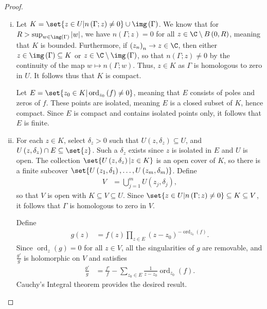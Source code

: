 \documentclass[10pt]{mypackage}
\begin{document}
\begin{proof}\hfill
  \begin{enumerate}[(i)]
    \item Let $K = \set{z\in U | n\left( \Gamma;z \right) \neq 0}\cup \img\left( \Gamma \right)$. We know that for $R > \sup_{w\in\img\left( \Gamma \right)}\left\vert w \right\vert$, we have $n\left( \Gamma;z \right) = 0$ for all $z\in \C\setminus B\left( 0,R \right)$, meaning that $K$ is bounded. Furthermore, if $\left( z_n \right)_n\rightarrow z\in \C$, then either $z\in \img\left( \Gamma \right)\subseteq K$ or $z\in \C\setminus \img\left( \Gamma \right)$, so that $n\left( \Gamma;z \right) \neq 0$ by the continuity of the map $w\mapsto n\left( \Gamma;w \right)$. Thus, $z\in K$ as $\Gamma$ is homologous to zero in $U$. It follows thus that $K$ is compact.%

      Let $E = \set{z_0\in K | \operatorname{ord}_{z_0}\left( f \right)\neq 0}$, meaning that $E$ consists of poles and zeros of $f$. These points are isolated, meaning $E$ is a closed subset of $K$, hence compact. Since $E$ is compact and contains isolated points only, it follows that $E$ is finite.
    \item For each $z\in K$, select $\delta_z > 0$ such that $U\left( z,\delta_z \right)\subseteq U$, and $U\left( z,\delta_z \right)\cap E \subseteq \set{z}$. Such a $\delta_z$ exists since $z$ is isolated in $E$ and $U$ is open. The collection $\set{U\left( z,\delta_z \right) | z\in K}$ is an open cover of $K$, so there is a finite subcover $\set{U\left( z_1,\delta_1 \right),\dots,U\left( z_m,\delta_m \right)}$. Define
      \begin{align*}
        V &= \bigcup_{j=1}^{m}U\left( z_j,\delta_j \right),
      \end{align*}
      so that $V$ is open with $K\subseteq V \subseteq U$. Since $\set{z\in U | n\left( \Gamma;z \right)\neq 0}\subseteq K\subseteq V$, it follows that $\Gamma$ is homologous to zero in $V$.%

      Define
      \begin{align*}
        g(z) &= f(z)\prod_{z\in E}\left( z-z_0 \right)^{-\operatorname{ord}_{z_0}(f)}.
      \end{align*}
      Since $\operatorname{ord}_z(g) = 0$ for all $z\in V$, all the singularities of $g$ are removable, and $\frac{g'}{g}$ is holomorphic on $V$ and satisfies
      \begin{align*}
        \frac{g'}{g} &= \frac{f'}{f} - \sum_{z_0\in E}\frac{1}{z-z_0}\operatorname{ord}_{z_0}(f).
      \end{align*}
      Cauchy's Integral theorem provides the desired result.
  \end{enumerate}
\end{proof}
\end{document}
